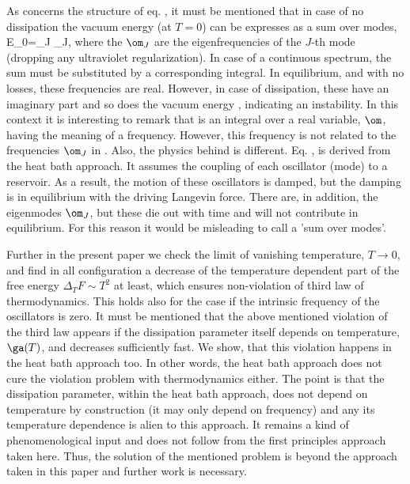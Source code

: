 \documentclass[notitlepage,prd,aps,longbibliography,twocolumn]{revtex4-1}
\begin{document}
As concerns the structure of eq. , it must be mentioned that in case of no dissipation the vacuum energy (at $T=0$) can be expresses as a sum over modes,
%
\be E_0=\sum_{J} \om_J,
\label{3}\ee
%
where the $\om_J$ are the eigenfrequencies of the $J$-th mode (dropping any ultraviolet  regularization). In case of a continuous spectrum, the sum must be substituted by a corresponding integral. In equilibrium, and with no losses, these frequencies are real. However, in case of dissipation, these have an imaginary part and so does the vacuum energy , indicating an instability. In this context it is interesting to remark that  is an integral over a real variable, $\om$, having the meaning of a frequency.  However, this frequency is not related to the frequencies $\om_J$ in . Also, the physics behind  is different. Eq. , is derived from the heat bath approach. It assumes the coupling of each oscillator (mode) to a reservoir. As a result, the motion of these oscillators is damped, but the damping is in equilibrium with the driving Langevin force. There are, in addition, the eigenmodes $\om_J$, but these die out with time and will not contribute in equilibrium. For this reason it would be misleading to call  a 'sum over modes'.

Further in the present paper we check the limit of vanishing temperature, $T\to0$, and find in all configuration a decrease of the temperature dependent part of the free energy $\Delta_TF\sim T^2$ at least, which ensures non-violation of third law of thermodynamics. This holds also for the case if the intrinsic frequency of the oscillators is zero. It must be mentioned that the above mentioned violation of the third law appears if the dissipation parameter itself depends on temperature, $\ga(T)$, and decreases sufficiently fast. We show, that this violation happens in the heat bath approach too. In other words, the heat bath approach does not cure the violation problem with thermodynamics either. The point is that the dissipation parameter, within the heat bath approach, does not depend on temperature by construction (it may only depend on frequency) and any its temperature dependence is alien to this approach. It remains a kind of phenomenological input and does not follow from the first principles approach taken here. Thus, the solution of the mentioned problem is beyond the approach taken in this paper and further work is necessary.
\end{document}
